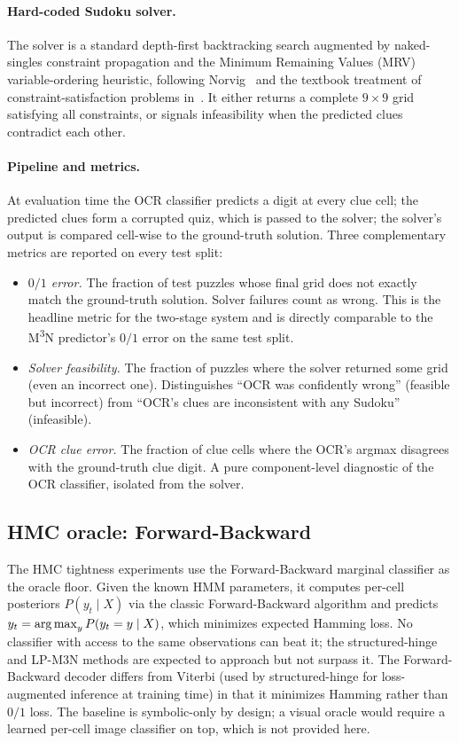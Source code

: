 \paragraph{Hard-coded Sudoku solver.}
The solver is a standard depth-first backtracking search
augmented by naked-singles constraint propagation and the
Minimum Remaining Values (MRV) variable-ordering heuristic,
following Norvig~\cite{norvig2006sudoku} and the textbook
treatment of constraint-satisfaction problems
in~\cite{russell2020aima}. It either returns a complete
$9 \times 9$ grid satisfying all constraints, or signals
infeasibility when the predicted clues contradict each other.

\paragraph{Pipeline and metrics.}
At evaluation time the OCR classifier predicts a digit at
every clue cell; the predicted clues form a corrupted quiz,
which is passed to the solver; the solver's output is compared
cell-wise to the ground-truth solution. Three complementary
metrics are reported on every test split:
\begin{itemize}
    \item \emph{$0/1$ error.} The fraction of test puzzles
    whose final grid does not exactly match the ground-truth
    solution. Solver failures count as wrong. This is the
    headline metric for the two-stage system and is directly
    comparable to the M\textsuperscript{3}N predictor's $0/1$
    error on the same test split.
    \item \emph{Solver feasibility.} The fraction of puzzles
    where the solver returned some grid (even an incorrect
    one). Distinguishes ``OCR was confidently wrong''
    (feasible but incorrect) from ``OCR's clues are
    inconsistent with any Sudoku'' (infeasible).
    \item \emph{OCR clue error.} The fraction of clue cells
    where the OCR's argmax disagrees with the ground-truth
    clue digit. A pure component-level diagnostic of the OCR
    classifier, isolated from the solver.
\end{itemize}

\subsection{HMC oracle: Forward-Backward}
\label{subsec:method-baseline-hmc-oracle}

The HMC tightness experiments use the Forward-Backward marginal
classifier as the oracle floor. Given the known HMM parameters,
it computes per-cell posteriors $P(y_t \mid X)$ via the classic
Forward-Backward algorithm and predicts
$y_t = \operatorname*{arg\,max}_y P(y_t = y \mid X)$, which minimizes expected
Hamming loss. No classifier with access to the same observations
can beat it; the structured-hinge and LP-M3N methods are
expected to approach but not surpass it. The Forward-Backward
decoder differs from Viterbi (used by structured-hinge for
loss-augmented inference at training time) in that it minimizes
Hamming rather than $0/1$ loss. The baseline is symbolic-only
by design; a visual oracle would require a learned per-cell
image classifier on top, which is not provided here.
